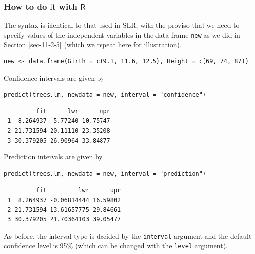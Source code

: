 \documentclass[captions=tableheading]{scrbook}
\begin{document}
\subsubsection{How to do it with \(\mathsf{R}\)}
\label{sec-12-2-5-1}


The syntax is identical to that used in SLR, with the proviso that we need to specify values of the independent variables in the data frame \texttt{new} as we did in Section \ref{sec-11-2-5} (which we repeat here for illustration).


\lstset{language=R}
\begin{lstlisting}
new <- data.frame(Girth = c(9.1, 11.6, 12.5), Height = c(69, 74, 87))
\end{lstlisting}

Confidence intervals are given by


\lstset{language=R}
\begin{lstlisting}
predict(trees.lm, newdata = new, interval = "confidence")
\end{lstlisting}

\begin{verbatim}
         fit      lwr      upr
 1  8.264937  5.77240 10.75747
 2 21.731594 20.11110 23.35208
 3 30.379205 26.90964 33.84877
\end{verbatim}



Prediction intervals are given by


\lstset{language=R}
\begin{lstlisting}
predict(trees.lm, newdata = new, interval = "prediction")
\end{lstlisting}

\begin{verbatim}
         fit         lwr      upr
 1  8.264937 -0.06814444 16.59802
 2 21.731594 13.61657775 29.84661
 3 30.379205 21.70364103 39.05477
\end{verbatim}



As before, the interval type is decided by the \texttt{interval} argument and the default confidence level is 95\% (which can be changed with the \texttt{level} argument).
\end{document}

